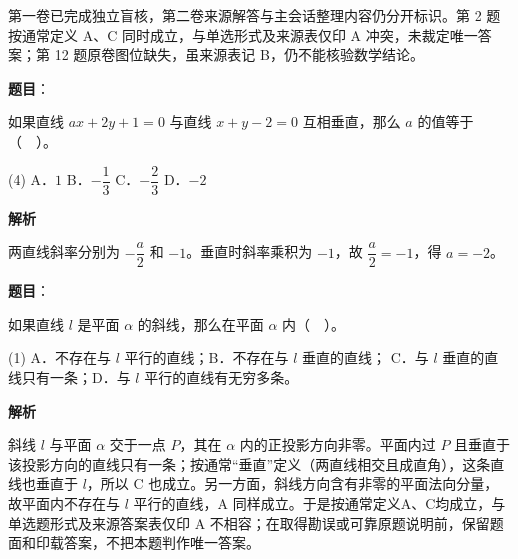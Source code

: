 

\begin{gktip}
第一卷已完成独立盲核，第二卷来源解答与主会话整理内容仍分开标识。第 2 题按通常定义 A、C 同时成立，与单选形式及来源表仅印 A 冲突，未裁定唯一答案；第 12 题原卷图位缺失，虽来源表记 B，仍不能核验数学结论。
\end{gktip}

\begin{answer}

\textbf{题目}：

如果直线 $ax+2y+1=0$ 与直线 $x+y-2=0$ 互相垂直，那么 $a$ 的值等于（　）。

\begin{gkopts}(4)
\task A．$1$
\task B．$-\dfrac{1}{3}$
\task C．$-\dfrac{2}{3}$
\task D．$-2$
\end{gkopts}

\textbf{解析}

两直线斜率分别为 $-\dfrac a2$ 和 $-1$。垂直时斜率乘积为 $-1$，故 $\dfrac a2=-1$，得 $a=-2$。


\end{answer}
\begin{answer}

\textbf{题目}：

如果直线 $l$ 是平面 $\alpha$ 的斜线，那么在平面 $\alpha$ 内（　）。

\begin{gkopts}(1)
\task A．不存在与 $l$ 平行的直线；B．不存在与 $l$ 垂直的直线；
\task C．与 $l$ 垂直的直线只有一条；D．与 $l$ 平行的直线有无穷多条。
\end{gkopts}

\textbf{解析}

斜线 $l$ 与平面 $\alpha$ 交于一点 $P$，其在 $\alpha$ 内的正投影方向非零。平面内过 $P$ 且垂直于该投影方向的直线只有一条；按通常“垂直”定义（两直线相交且成直角），这条直线也垂直于 $l$，所以 C 也成立。另一方面，斜线方向含有非零的平面法向分量，故平面内不存在与 $l$ 平行的直线，A 同样成立。于是按通常定义A、C均成立，与单选题形式及来源答案表仅印 A 不相容；在取得勘误或可靠原题说明前，保留题面和印载答案，不把本题判作唯一答案。


\end{answer}
